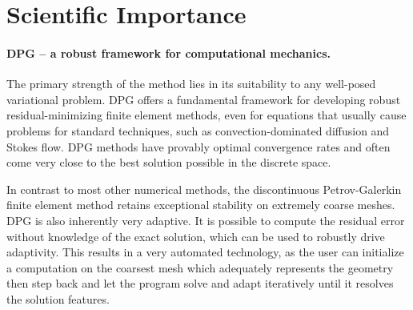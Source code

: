 \documentclass[letterpaper,12pt]{article}
\begin{document}
\section*{Scientific Importance}
\paragraph{DPG -- a robust framework for computational mechanics.}
The primary strength of the method lies in its suitability to any well-posed variational problem.
DPG offers a fundamental framework for developing robust residual-minimizing finite element methods, even for equations that usually cause problems
for standard techniques, such as convection-dominated diffusion and Stokes flow.
DPG methods have provably optimal convergence rates and often come very close to the best solution possible in the discrete space.

In contrast to most other numerical methods, the discontinuous Petrov-Galerkin finite element method retains exceptional stability on extremely coarse meshes.
DPG is also inherently very adaptive.
It is possible to compute the residual error without knowledge of the exact solution, which can be used to robustly drive adaptivity.
This results in a very automated technology, as the user can initialize a computation on the coarsest mesh which adequately represents the geometry 
then step back and let the program solve and adapt iteratively until it resolves the solution features.
\end{document}
